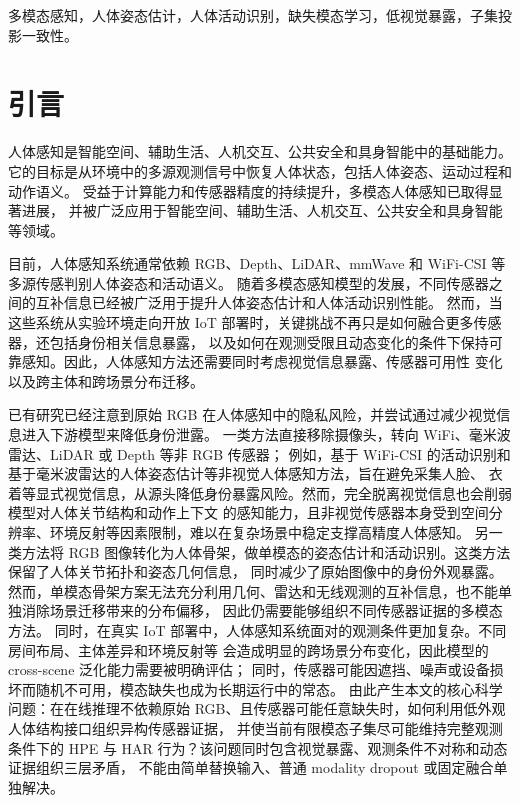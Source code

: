 \documentclass[journal]{IEEEtran}
\begin{document}
\begin{IEEEkeywords}
多模态感知，人体姿态估计，人体活动识别，缺失模态学习，低视觉暴露，子集投影一致性。
\end{IEEEkeywords}

\section{引言}
人体感知是智能空间、辅助生活、人机交互、公共安全和具身智能中的基础能力。
它的目标是从环境中的多源观测信号中恢复人体状态，包括人体姿态、运动过程和动作语义。
受益于计算能力和传感器精度的持续提升，多模态人体感知已取得显著进展，
并被广泛应用于智能空间、辅助生活、人机交互、公共安全和具身智能等领域\cite{mmfi,xfi}。

目前，人体感知系统通常依赖 RGB、Depth、LiDAR、mmWave 和 WiFi-CSI 等多源传感判别人体姿态和活动语义。
随着多模态感知模型的发展，不同传感器之间的互补信息已经被广泛用于提升人体姿态估计和人体活动识别性能。
然而，当这些系统从实验环境走向开放 IoT 部署时，关键挑战不再只是如何融合更多传感器，还包括身份相关信息暴露，
以及如何在观测受限且动态变化的条件下保持可靠感知。因此，人体感知方法还需要同时考虑视觉信息暴露、传感器可用性
变化以及跨主体和跨场景分布迁移。

已有研究已经注意到原始 RGB 在人体感知中的隐私风险，并尝试通过减少视觉信息进入下游模型来降低身份泄露。
一类方法直接移除摄像头，转向 WiFi、毫米波雷达、LiDAR 或 Depth 等非 RGB 传感器；
例如，基于 WiFi-CSI 的活动识别和基于毫米波雷达的人体姿态估计等非视觉人体感知方法\cite{metafi,virteach,adapose,robustwifi}，旨在避免采集人脸、
衣着等显式视觉信息，从源头降低身份暴露风险。然而，完全脱离视觉信息也会削弱模型对人体关节结构和动作上下文
的感知能力，且非视觉传感器本身受到空间分辨率、环境反射等因素限制，难以在复杂场景中稳定支撑高精度人体感知。
另一类方法将 RGB 图像转化为人体骨架，做单模态的姿态估计和活动识别\cite{openpose,hrnet,vitpose,stgcn}。这类方法保留了人体关节拓扑和姿态几何信息，
同时减少了原始图像中的身份外观暴露。然而，单模态骨架方案无法充分利用几何、雷达和无线观测的互补信息，也不能单独消除场景迁移带来的分布偏移，
因此仍需要能够组织不同传感器证据的多模态方法。
同时，在真实 IoT 部署中，人体感知系统面对的观测条件更加复杂。不同房间布局、主体差异和环境反射等
会造成明显的跨场景分布变化，因此模型的 cross-scene 泛化能力需要被明确评估；
同时，传感器可能因遮挡、噪声或设备损坏而随机不可用，模态缺失也成为长期运行中的常态\cite{goodPracticeMissing,moddrop,incompleteKD,mmanet}。
由此产生本文的核心科学问题：在在线推理不依赖原始 RGB、且传感器可能任意缺失时，如何利用低外观人体结构接口组织异构传感器证据，
并使当前有限模态子集尽可能维持完整观测条件下的 HPE 与 HAR 行为？该问题同时包含视觉暴露、观测条件不对称和动态证据组织三层矛盾，
不能由简单替换输入、普通 modality dropout 或固定融合单独解决。
\end{document}
